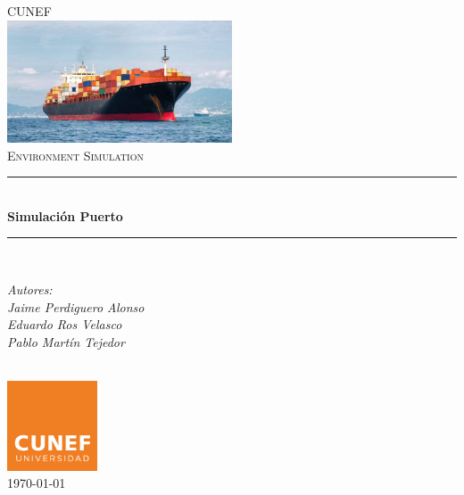 \documentclass[12pt]{article}
\begin{document}
\begin{titlepage}

\newcommand{\HRule}{\rule{\linewidth}{0.5mm}} 

\center 
 

\textsc{\LARGE CUNEF}\\[1.5cm] 
\includegraphics[width=0.5\textwidth]{ALGECIRAS.jpeg}\\[1cm] 
\textsc{\Large Environment Simulation}\\[0.5cm] 


\HRule \\[0.4cm]
{ \huge \bfseries Simulación Puerto}\\[0.4cm] 
\HRule \\[1cm]
 

\begin{minipage}{0.4\textwidth}
\begin{flushleft} \large
\begin{center}
\emph{Autores: \\ Jaime Perdiguero Alonso\\ Eduardo Ros Velasco\\ Pablo Martín Tejedor}
 \textsc\\ %
 \end{center}
\end{flushleft}

\end{minipage}\\[1cm]


\includegraphics[width=0.2\textwidth]{LOGO CUNEF.png}\\[1cm] 
{\large \today}\\[2cm] 

\vfill 



\end{titlepage}
\end{document}

